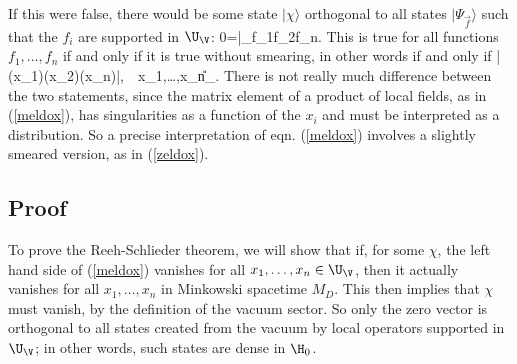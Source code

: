 \documentclass[12pt]{article}
\numberwithin{equation}{section}
\begin{document}
If this were false, there would be some state $|\chi\rangle$ orthogonal to all states $|\Psi_{\vec f}\rangle$ such that the $f_i$
are supported in $\U_\V$:
\be\label{zeldox}0=\langle \chi|\Psi_{f_1f_2\cdots f_n}\rangle.\ee 
This is true  for all functions $f_1,\dots,f_n$ if and only if it is true without smearing, in other words if and only if
\be\label{meldox}\langle\chi|\phi(x_1)\phi(x_2)\cdots \phi(x_n)|\Omega{},~~x_1,\dots,x_n\in \U_\V. \ee 
There is not really much difference between the two statements, since the matrix element of a product of local fields,
as in (\ref{meldox}), has singularities as a function of the $x_i$ and must be interpreted as a distribution.  So a precise interpretation of
eqn. (\ref{meldox}) involves a slightly smeared version, as in (\ref{zeldox}).  


\subsection{Proof}\label{proof}

To prove the Reeh-Schlieder theorem, we will show that if, for some $\chi$, the left hand side of (\ref{meldox}) vanishes
for all $x_1,\dots,x_n\in \U_\V$, then it actually vanishes for all $x_1,\dots,x_n$ in Minkowski spacetime $M_D$.  This then
implies that $\chi$ must vanish, by the definition of the vacuum sector.  So only the zero vector is orthogonal to all states
created from the vacuum by local operators supported in $\U_\V$; in other words, such states are dense in $\H_0$.
\end{document}
